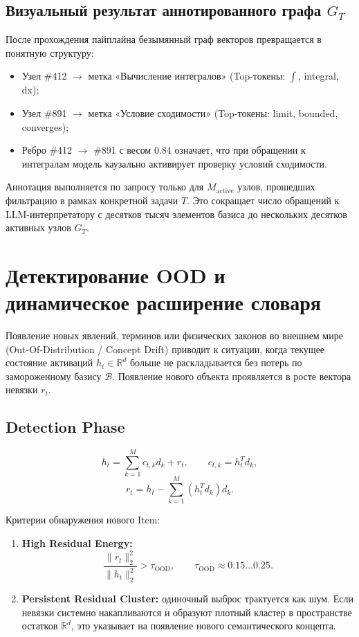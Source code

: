 \documentclass[11pt,a4paper]{article}
\begin{document}
\fi
\subsection*{Визуальный результат аннотированного графа $G_T$}

После прохождения пайплайна безымянный граф векторов превращается в понятную структуру:
\begin{itemize}
    \item Узел \#412 $\rightarrow$ метка «Вычисление интегралов» (Top-токены: $\int$, integral, dx);
    \item Узел \#891 $\rightarrow$ метка «Условие сходимости» (Top-токены: limit, bounded, converges);
    \item Ребро \#412 $\rightarrow$ \#891 с весом 0.84 означает, что при обращении к интегралам модель каузально активирует проверку условий сходимости.
\end{itemize}

Аннотация выполняется по запросу только для $M_{\text{active}}$ узлов, прошедших фильтрацию в рамках конкретной задачи $T$. Это сокращает число обращений к LLM-интерпретатору с десятков тысяч элементов базиса до нескольких десятков активных узлов $G_T$.

\section{Детектирование OOD и динамическое расширение словаря}

Появление новых явлений, терминов или физических законов во внешнем мире (Out-Of-Distribution / Concept Drift) приводит к ситуации, когда текущее состояние активаций $h_t\in\mathbb{R}^d$ больше не раскладывается без потерь по замороженному базису $\mathcal{B}$. Появление нового объекта проявляется в росте вектора невязки $r_t$.

\subsection*{Detection Phase}

\[
h_t=\sum_{k=1}^{M}c_{t,k}d_k+r_t,
\qquad
c_{t,k}=h_t^Td_k,
\]
\[
r_t=h_t-\sum_{k=1}^{M}(h_t^Td_k)d_k.
\]

Критерии обнаружения нового Item:
\begin{enumerate}
    \item \textbf{High Residual Energy:}
    \[
    \frac{\|r_t\|_2^2}{\|h_t\|_2^2}>\tau_{\text{OOD}},
    \qquad
    \tau_{\text{OOD}}\approx0.15\ldots0.25.
    \]
    \item \textbf{Persistent Residual Cluster:} одиночный выброс трактуется как шум. Если невязки системно накапливаются и образуют плотный кластер в пространстве остатков $\mathbb{R}^d$, это указывает на появление нового семантического концепта.
\end{enumerate}
\end{document}

